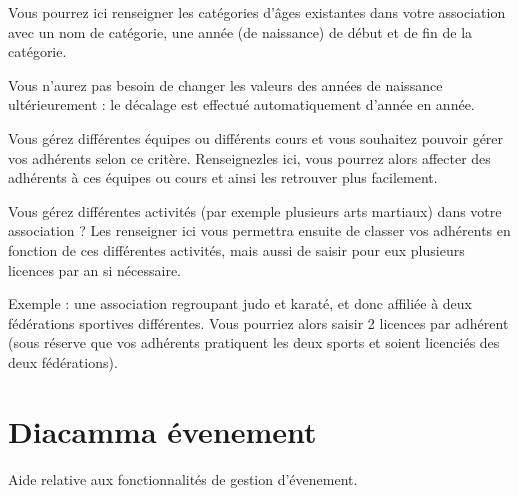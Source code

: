 \documentclass[a4paper,10pt,oneside,french]{sphinxmanual}
\begin{document}
\sphinxAtStartPar
{}

\sphinxAtStartPar
Vous pourrez ici renseigner les catégories d’âges existantes dans votre association avec un nom de catégorie, une année (de naissance) de début et de fin de la catégorie.

\sphinxAtStartPar
Vous n’aurez pas besoin de changer les valeurs des années de naissance ultérieurement : le décalage est effectué automatiquement d’année en année.
\begin{quote}

\noindent{}
\end{quote}

\sphinxAtStartPar
{}

\sphinxAtStartPar
Vous gérez différentes équipes ou différents cours et vous souhaitez pouvoir gérer vos adhérents selon ce critère.
Renseignez\sphinxhyphen{}les ici, vous pourrez alors affecter des adhérents à ces équipes ou cours et ainsi les retrouver plus facilement.
\begin{quote}

\noindent{}
\end{quote}

\sphinxAtStartPar
{}

\sphinxAtStartPar
Vous gérez différentes activités (par exemple plusieurs arts martiaux) dans votre association ? Les renseigner ici vous permettra ensuite de classer vos adhérents en fonction de ces différentes activités, mais aussi de saisir pour eux plusieurs licences par an si nécessaire.

\sphinxAtStartPar
Exemple : une association regroupant judo et karaté, et donc affiliée à deux fédérations sportives différentes.
Vous pourriez alors saisir 2 licences par adhérent (sous réserve que vos adhérents pratiquent les deux sports et soient licenciés des deux fédérations).
\begin{quote}

\noindent{}
\end{quote}


\chapter{Diacamma évenement}
\label{\detokenize{event/index:diacamma-evenement}}\label{\detokenize{event/index::doc}}
\sphinxAtStartPar
Aide relative aux fonctionnalités de gestion d’évenement.
\end{document}
